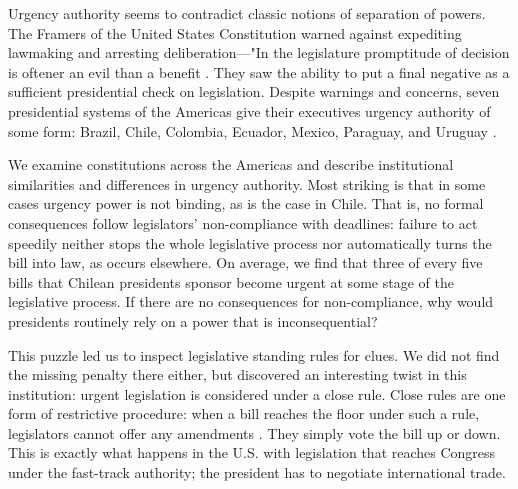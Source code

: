 \documentclass[letter,12pt]{article}
\begin{document}
Urgency authority seems to contradict classic notions of separation of powers. The Framers of the United States Constitution warned against expediting lawmaking and arresting deliberation---"In the legislature promptitude of decision is oftener an evil than a benefit \citep[][, LXX]{hamilton70.1788}. They saw the ability to put a final negative as a sufficient presidential check on legislation. Despite warnings and concerns, seven presidential systems of the Americas give their executives urgency authority of some form: Brazil, Chile, Colombia, Ecuador, Mexico, Paraguay, and Uruguay \citep{morgenstern.nacif.2002,garcia.montero.presidentes.2009}. 

We examine constitutions across the Americas and describe institutional similarities and differences in urgency authority. Most striking is that in some cases urgency power is not binding, as is the case in Chile. That is, no formal consequences follow legislators’ non-compliance with deadlines: failure to act speedily neither stops the whole legislative process nor automatically turns the bill into law, as occurs elsewhere. On average, we find that three of every five bills that Chilean presidents sponsor become urgent at some stage of the legislative process. If there are no consequences for non-compliance, why would presidents routinely rely on a power that is inconsequential?

This puzzle led us to inspect legislative standing rules for clues. We did not find the missing penalty there either, but discovered an interesting twist in this institution: urgent legislation is considered under a close rule. Close rules are one form of restrictive procedure: when a bill reaches the floor under such a rule, legislators cannot offer any amendments  \citep{oleszek.2001}. They simply vote the bill up or down. This is exactly what happens in the U.S. with legislation that reaches Congress under the fast-track authority; the president has to negotiate international trade.
\end{document}
